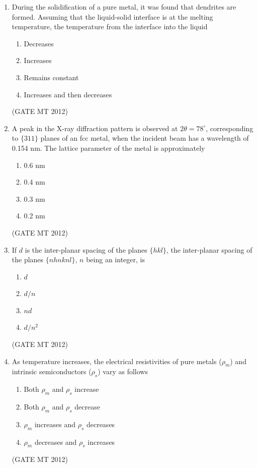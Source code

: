 \documentclass[journal, 11pt, onecolumn]{IEEEtran}
\theoremstyle{remark}
\begin{document}
\begin{enumerate}
\item During the solidification of a pure metal, it was found that dendrites are formed. Assuming that the liquid-solid interface is at the melting temperature, the temperature from the interface into the liquid  
\begin{multicols}{2}
\begin{enumerate}  
\item Decreases
\item Increases
\item Remains constant
\item Increases and then decreases
\end{enumerate}
\end{multicols}
\hfill(GATE MT 2012)
 

\item A peak in the X-ray diffraction pattern is observed at $2\theta = 78^\circ$, corresponding to $\{311\}$ planes of an fcc metal, when the incident beam has a wavelength of 0.154 nm. The lattice parameter of the metal is approximately  
\begin{multicols}{4}
\begin{enumerate}  
\item 0.6 nm
\item 0.4 nm
\item 0.3 nm
\item 0.2 nm
\end{enumerate}
\end{multicols}
\hfill(GATE MT 2012)
 

\item If $d$ is the inter-planar spacing of the planes $\{h k l\}$, the inter-planar spacing of the planes $\{n h n k n l\}$, $n$ being an integer, is  
\begin{multicols}{4}
\begin{enumerate}  
\item $d$
\item $d/n$
\item $nd$
\item $d/n^2$
\end{enumerate}
\end{multicols}
\hfill(GATE MT 2012)
 

\item As temperature increases, the electrical resistivities of pure metals ($\rho_m$) and intrinsic semiconductors ($\rho_s$) vary as follows  
\begin{multicols}{2}
\begin{enumerate}  
\item Both $\rho_m$ and $\rho_s$ increase
\item Both $\rho_m$ and $\rho_s$ decrease
\item $\rho_m$ increases and $\rho_s$ decreases
\item $\rho_m$ decreases and $\rho_s$ increases
\end{enumerate}
\end{multicols}
\hfill(GATE MT 2012)
 


\end{enumerate}
\end{document}
